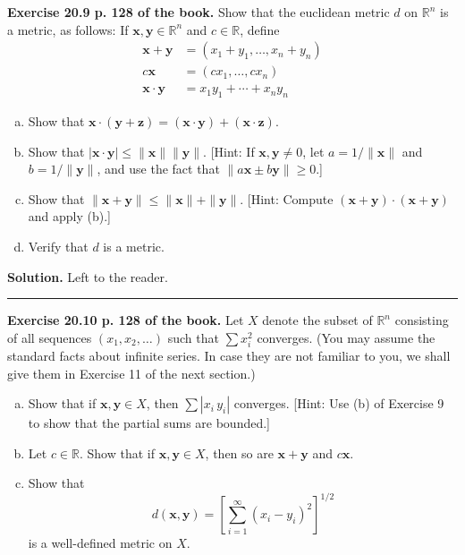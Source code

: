 \documentclass[12pt,letterpaper]{article}
\newcommand{\noi}{\noindent}%
\begin{document}
\noi\textbf{Exercise 20.9 p. 128 of the book.} Show that the euclidean metric $d$ on $\mathbb{R}^{n}$ is a metric, as follows: If $\mathbf{x}, \mathbf{y} \in \mathbb{R}^{n}$ and $c \in \mathbb{R}$, define
    \begin{align*}
    \mathbf{x}+\mathbf{y} & =\left(x_{1}+y_{1}, \ldots, x_{n}+y_{n}\right) \\
    c \mathbf{x} & =\left(c x_{1}, \ldots, c x_{n}\right) \\
    \mathbf{x} \cdot \mathbf{y} & =x_{1} y_{1}+\cdots+x_{n} y_{n}
    \end{align*}
    \begin{enumerate}[(a)]
        \item Show that $\mathbf{x} \cdot(\mathbf{y}+\mathbf{z})=(\mathbf{x} \cdot \mathbf{y})+(\mathbf{x} \cdot \mathbf{z})$.
        \item Show that $|\mathbf{x} \cdot \mathbf{y}| \leq\|\mathbf{x}\|\|\mathbf{y}\|$. [Hint: If $\mathbf{x}, \mathbf{y} \neq 0$, let $a=1 /\|\mathbf{x}\|$ and $b=1 /\|\mathbf{y}\|$, and use the fact that $\|a \mathbf{x} \pm b \mathbf{y}\| \geq 0$.]
        \item Show that $\|\mathbf{x}+\mathbf{y}\| \leq\|\mathbf{x}\|+\|\mathbf{y}\|$. [Hint: Compute $(\mathbf{x}+\mathbf{y}) \cdot(\mathbf{x}+\mathbf{y})$ and apply (b).]
        \item Verify that $d$ is a metric.
    \end{enumerate}

\noi\textbf{Solution.} Left to the reader. 

\bigskip\bigskip\hrule\bigskip

\noi\textbf{Exercise 20.10 p. 128 of the book.} Let $X$ denote the subset of $\mathbb{R}^{n}$ consisting of all sequences $\left(x_{1}, x_{2}, \ldots\right)$ such that $\sum x_{i}^{2}$ converges. (You may assume the standard facts about infinite series. In case they are not familiar to you, we shall give them in Exercise 11 of the next section.)
    \begin{enumerate}[(a)]
        \item Show that if $\mathbf{x},\mathbf{y}\in X$, then $\sum\left|x_i\,y_i\right|$ converges. [Hint: Use (b) of Exercise 9 to show that the partial sums are bounded.]
        \item Let $c \in \mathbb{R}$. Show that if $\mathbf{x}, \mathbf{y} \in X$, then so are $\mathbf{x}+\mathbf{y}$ and $c\mathbf{x}$.
        \item Show that
        \begin{equation*}
        d(\mathbf{x}, \mathbf{y})=\left[\sum_{i=1}^{\infty}\left(x_{i}-y_{i}\right)^{2}\right]^{1 / 2}
        \end{equation*}
        is a well-defined metric on $X$.
    \end{enumerate}
\end{document}
